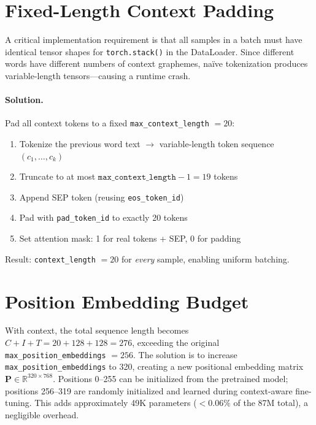\documentclass[11pt, a4paper]{report}
\begin{document}
\section{Fixed-Length Context Padding}
\label{sec:fixed-padding}

A critical implementation requirement is that all samples in a batch must have identical tensor shapes for \texttt{torch.stack()} in the DataLoader. Since different words have different numbers of context graphemes, na\"ive tokenization produces variable-length tensors---causing a runtime crash.

\paragraph{Solution.} Pad all context tokens to a fixed \texttt{max\_context\_length} $= 20$:
\begin{enumerate}[leftmargin=2em]
  \item Tokenize the previous word text $\to$ variable-length token sequence $(c_1, \ldots, c_k)$
  \item Truncate to at most $\texttt{max\_context\_length} - 1 = 19$ tokens
  \item Append SEP token (reusing \texttt{eos\_token\_id})
  \item Pad with \texttt{pad\_token\_id} to exactly 20 tokens
  \item Set attention mask: 1 for real tokens + SEP, 0 for padding
\end{enumerate}

Result: \texttt{context\_length} $= 20$ for \emph{every} sample, enabling uniform batching.

\section{Position Embedding Budget}
\label{sec:position-budget}

With context, the total sequence length becomes $C + I + T = 20 + 128 + 128 = 276$, exceeding the original \texttt{max\_position\_embeddings} $= 256$. The solution is to increase \texttt{max\_position\_embeddings} to 320, creating a new positional embedding matrix $\mathbf{P} \in \mathbb{R}^{320 \times 768}$. Positions 0--255 can be initialized from the pretrained model; positions 256--319 are randomly initialized and learned during context-aware fine-tuning. This adds approximately 49K parameters ($< 0.06\%$ of the 87M total), a negligible overhead.


\end{document}

